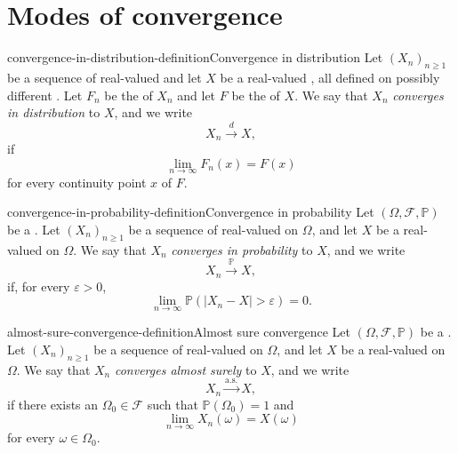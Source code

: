 \documentclass[preview]{standalone}
\begin{document}
\genpage

\section{Modes of convergence}

\begin{snippetdefinition}{convergence-in-distribution-definition}{Convergence in distribution}
    Let \((X_n)_{n\geq 1}\) be a sequence of real-valued
     and let \(X\) be a real-valued
    \randomvariable, all defined on possibly different .
    Let \(F_n\) be the \distributionfunction of \(X_n\) and let \(F\) be the
    \distributionfunction of \(X\). We say that \(X_n\)
    \emph{converges in distribution} to \(X\), and we write
    \[
        X_n \xrightarrow{d} X,
    \]
    if
    \[
        \lim_{n\to\infty}F_n(x)=F(x)
    \]
    for every continuity point \(x\) of \(F\).
\end{snippetdefinition}

\begin{snippetdefinition}{convergence-in-probability-definition}{Convergence in probability}
    Let \((\Omega,\mathcal{F},\mathbb{P})\) be a \probabilityspace.
    Let \((X_n)_{n\geq 1}\) be a sequence of real-valued
     on \(\Omega\), and let \(X\) be a
    real-valued \randomvariable on \(\Omega\). We say that \(X_n\)
    \emph{converges in probability} to \(X\), and we write
    \[
        X_n \xrightarrow{\mathbb{P}} X,
    \]
    if, for every \(\varepsilon>0\),
    \[
        \lim_{n\to\infty}\mathbb{P}\left(|X_n-X|>\varepsilon\right)=0.
    \]
\end{snippetdefinition}

\begin{snippetdefinition}{almost-sure-convergence-definition}{Almost sure convergence}
    Let \((\Omega,\mathcal{F},\mathbb{P})\) be a \probabilityspace.
    Let \((X_n)_{n\geq 1}\) be a sequence of real-valued
     on \(\Omega\), and let \(X\) be a
    real-valued \randomvariable on \(\Omega\). We say that \(X_n\)
    \emph{converges almost surely} to \(X\), and we write
    \[
        X_n \xrightarrow{\mathrm{a.s.}} X,
    \]
    if there exists an \event \(\Omega_0\in\mathcal{F}\) such that
    \(\mathbb{P}(\Omega_0)=1\) and
    \[
        \lim_{n\to\infty}X_n(\omega)=X(\omega)
    \]
    for every \(\omega\in\Omega_0\).
\end{snippetdefinition}
\end{document}
